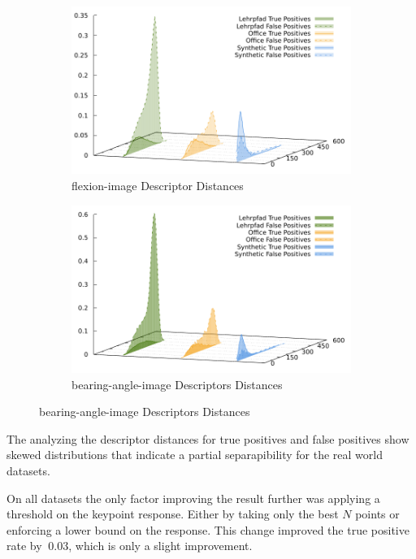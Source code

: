 \begin{figure}[H]
\begin{subfigure}[t]{0.45\linewidth}
    \includegraphics[width=\linewidth]{chapter06/results/SIFT/flexion/descriptor_distances.pdf}%
    \caption{\gls{flexion-image} Descriptor Distances}
\end{subfigure}\quad
\begin{subfigure}[t]{0.45\linewidth}
    \includegraphics[width=\linewidth]{chapter06/results/SIFT/bearing/descriptor_distances.pdf}%
    \caption{\gls{bearing-angle-image} Descriptors Distances}
\end{subfigure}
\end{figure}
The analyzing the descriptor distances for true positives and false positives show skewed distributions that indicate a partial separapibility for the real world datasets.

On all datasets the only factor improving the result further was applying a threshold on the keypoint response.
Either by taking only the best $N$ points or enforcing a lower bound on the response.
This change improved the true positive rate by $~0.03$, which is only a slight improvement.


